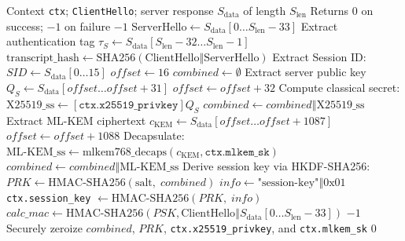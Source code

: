 \documentclass[journal, 10pt]{IEEEtran}
\begin{document}
\begin{algorithm}[!t]
\caption{Server Response Processing and Key Agreement}
\begin{algorithmic}[1]
\REQUIRE Context \texttt{ctx}; \texttt{ClientHello}; server response $S_{\text{data}}$ of length $S_{\text{len}}$
\ENSURE Returns $0$ on success; $-1$ on failure
    \RETURN $-1$
\ENDIF
\STATE $\text{ServerHello} \leftarrow S_{\text{data}}[0 \dots S_{\text{len}} - 33]$
\STATE Extract authentication tag $\tau_S \leftarrow S_{\text{data}}[S_{\text{len}} - 32 \dots S_{\text{len}} - 1]$
\STATE $\text{transcript\_hash} \leftarrow \text{SHA256}(\text{ClientHello} \mathbin{\Vert} \text{ServerHello})$
\STATE Extract Session ID: $\mathit{SID} \leftarrow S_{\text{data}}[0 \dots 15]$
\STATE $\mathit{offset} \leftarrow 16$
\STATE $\mathit{combined} \leftarrow \emptyset$
    \STATE Extract server public key $Q_S \leftarrow S_{\text{data}}[\mathit{offset} \dots \mathit{offset}+31]$
    \STATE $\mathit{offset} \leftarrow \mathit{offset} + 32$
    \STATE Compute classical secret: $\text{X25519\_ss} \leftarrow [\texttt{ctx.x25519\_privkey}] Q_S$
    \STATE $\mathit{combined} \leftarrow \mathit{combined} \mathbin{\Vert} \text{X25519\_ss}$
\ENDIF
{}
    \STATE Extract ML-KEM ciphertext $c_{\text{KEM}} \leftarrow S_{\text{data}}[\mathit{offset} \dots \mathit{offset} + 1087]$
    \STATE $\mathit{offset} \leftarrow \mathit{offset} + 1088$
    \STATE Decapsulate: $\text{ML-KEM\_ss} \leftarrow \text{mlkem768\_decaps}(c_{\text{KEM}}, \texttt{ctx.mlkem\_sk})$
    \STATE $\mathit{combined} \leftarrow \mathit{combined} \mathbin{\Vert} \text{ML-KEM\_ss}$
\ENDIF
\STATE Derive session key via HKDF-SHA256:
\STATE $\mathit{PRK} \leftarrow \text{HMAC-SHA256}(\text{salt},\; \mathit{combined})$ 
\STATE $\mathit{info} \leftarrow \text{"session-key"} \mathbin{\Vert} \text{0x01}$
\STATE \texttt{ctx.session\_key} $\leftarrow \text{HMAC-SHA256}(\mathit{PRK},\; \mathit{info})$ 
\STATE $\mathit{calc\_mac} \leftarrow \text{HMAC-SHA256}(PSK, \text{ClientHello} \mathbin{\Vert} S_{\text{data}}[0 \dots S_{\text{len}} - 33])$
    \RETURN $-1$ 
\ENDIF
\STATE Securely zeroize $\mathit{combined}$, $\mathit{PRK}$, \texttt{ctx.x25519\_privkey}, and \texttt{ctx.mlkem\_sk}
\RETURN $0$
\end{algorithmic}
\end{algorithm}
\end{document}
